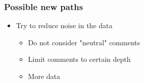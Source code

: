 \documentclass{beamer}
\begin{document}
%
%
%
%
%

\begin{frame}[c]
    \frametitle{Possible new paths}

    \begin{itemize}
        \item Try to reduce noise in the data
            \begin{itemize}
                \item Do not consider "neutral" comments
                \item Limit comments to certain depth
                \item More data
            \end{itemize}
    \end{itemize}
    
\end{frame}
\end{document}
